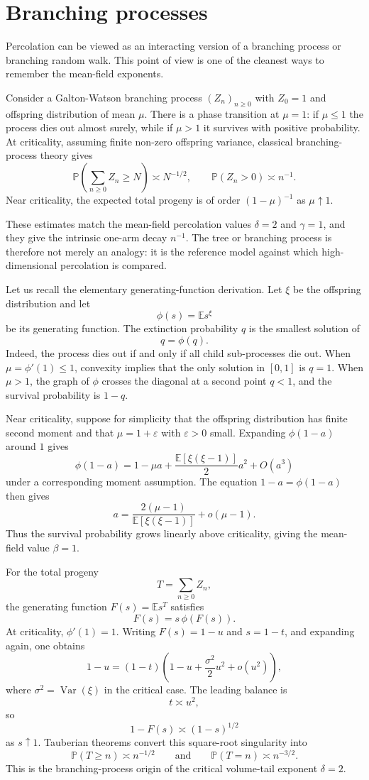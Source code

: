 \documentclass[11pt,reqno]{book}
\numberwithin{equation}{chapter}
\theoremstyle{plain}
\theoremstyle{definition}
\theoremstyle{remark}
\renewcommand{\P}{\mathbb P}
\newcommand{\E}{\mathbb E}
\newcommand{\eps}{\varepsilon}
\newcommand{\1}{\mathbf 1}
\newcommand{\as}{\asymp}
\DeclareMathOperator{\Var}{Var}
\begin{document}
\section{Branching processes}

Percolation can be viewed as an interacting version of a branching process or branching random walk. This point of view is one of the cleanest ways to remember the mean-field exponents.

Consider a Galton-Watson branching process $(Z_n)_{n\geq 0}$ with $Z_0=1$ and offspring distribution of mean $\mu$. There is a phase transition at $\mu=1$: if $\mu\leq 1$ the process dies out almost surely, while if $\mu>1$ it survives with positive probability. At criticality, assuming finite non-zero offspring variance, classical branching-process theory gives
\[
  \P\left(\sum_{n\geq 0} Z_n\geq N\right)\as N^{-1/2},
  \qquad
  \P(Z_n>0)\as n^{-1}.
\]
Near criticality, the expected total progeny is of order $(1-\mu)^{-1}$ as $\mu\uparrow 1$.

These estimates match the mean-field percolation values $\delta=2$ and $\gamma=1$, and they give the intrinsic one-arm decay $n^{-1}$. The tree or branching process is therefore not merely an analogy: it is the reference model against which high-dimensional percolation is compared.

Let us recall the elementary generating-function derivation. Let $\xi$ be the offspring distribution and let
\[
  \phi(s)=\E s^\xi
\]
be its generating function. The extinction probability $q$ is the smallest solution of
\[
  q=\phi(q).
\]
Indeed, the process dies out if and only if all child sub-processes die out. When $\mu=\phi'(1)\leq 1$, convexity implies that the only solution in $[0,1]$ is $q=1$. When $\mu>1$, the graph of $\phi$ crosses the diagonal at a second point $q<1$, and the survival probability is $1-q$.

Near criticality, suppose for simplicity that the offspring distribution has finite second moment and that $\mu=1+\eps$ with $\eps>0$ small. Expanding $\phi(1-a)$ around $1$ gives
\[
  \phi(1-a)
  =
  1-\mu a+\frac{\E[\xi(\xi-1)]}{2}a^2+O(a^3)
\]
under a corresponding moment assumption. The equation $1-a=\phi(1-a)$ then gives
\[
  a
  =
  \frac{2(\mu-1)}{\E[\xi(\xi-1)]}+o(\mu-1).
\]
Thus the survival probability grows linearly above criticality, giving the mean-field value $\beta=1$.

For the total progeny
\[
  T=\sum_{n\geq 0}Z_n,
\]
the generating function $F(s)=\E s^T$ satisfies
\[
  F(s)=s\,\phi(F(s)).
\]
At criticality, $\phi'(1)=1$. Writing $F(s)=1-u$ and $s=1-t$, and expanding again, one obtains
\[
  1-u
  =
  (1-t)\left(1-u+\frac{\sigma^2}{2}u^2+o(u^2)\right),
\]
where $\sigma^2=\Var(\xi)$ in the critical case. The leading balance is
\[
  t\as u^2,
\]
so
\[
  1-F(s)\as (1-s)^{1/2}
\]
as $s\uparrow 1$. Tauberian theorems convert this square-root singularity into
\[
  \P(T\geq n)\as n^{-1/2}
  \qquad\text{and}\qquad
  \P(T=n)\as n^{-3/2}.
\]
This is the branching-process origin of the critical volume-tail exponent $\delta=2$.
\end{document}

